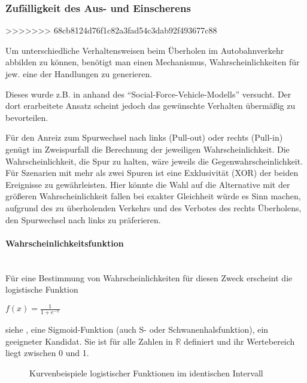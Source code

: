 \subsubsection{Zufälligkeit des Aus- und Einscherens}
>>>>>>> 68cb8124d76f1c82a3fad54c3dab92f493677c88
\label{sec:pullout-pullin}

Um unterschiedliche Verhaltensweisen beim Überholen im Autobahnverkehr abbilden zu können, benötigt man einen Mechanismus, Wahrscheinlichkeiten für jew. eine der Handlungen zu generieren.

Dieses wurde z.B. in \cite{dat-ba} anhand des \enquote{Social-Force-Vehicle-Modells} versucht. 
Der dort erarbeitete Ansatz scheint jedoch das gewünschte Verhalten übermäßig zu bevorteilen.

Für den Anreiz zum Spurwechsel nach links (Pull-out) oder rechts (Pull-in) genügt im Zweispurfall die Berechnung der jeweiligen Wahrscheinlichkeit.
Die Wahrscheinlichkeit, die Spur zu halten, wäre jeweils die Gegenwahrscheinlichkeit.
\\
Für Szenarien mit mehr als zwei Spuren ist eine Exklusivität (XOR) der beiden Ereignisse zu gewährleisten.
Hier könnte die Wahl auf die Alternative mit der größeren Wahrscheinlichkeit fallen bei exakter Gleichheit würde es Sinn machen, aufgrund des zu überholenden Verkehrs und des Verbotes des rechts Überholens, den Spurwechsel nach links zu präferieren.

\paragraph*{Wahrscheinlichkeitsfunktion} 
\hfill \\
Für eine Bestimmung von Wahrscheinlichkeiten für diesen Zweck erscheint die logistische Funktion  
\begin{center}
$ f(x) = \frac{1}{1 + e^{-x}} $ 
\end{center}
siehe \cite{logistic-function}, eine Sigmoid-Funktion (auch S- oder Schwanenhalsfunktion), ein geeigneter Kandidat. 
Sie ist für alle Zahlen in $ \mathbb{R} $ definiert und ihr Wertebereich liegt zwischen 0 und 1.

\begin{figure}[hptb]
  \centering
     \qquad 
  \caption[Kurvenbeispiele der logistischen Funktion]
          {Kurvenbeispiele logistischer Funktionen im identischen Intervall}
  \label{figure:kurve-logistic}
\end{figure}

